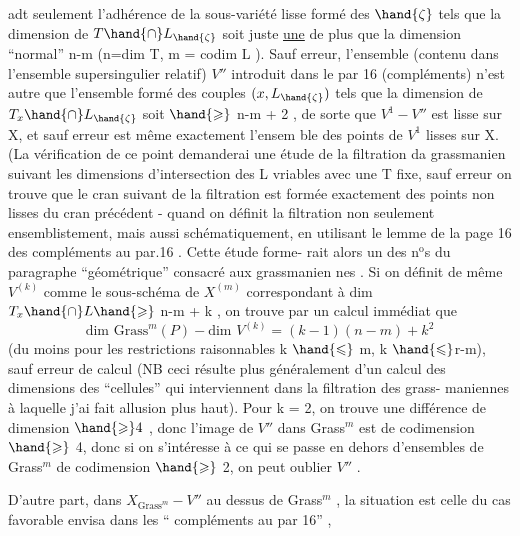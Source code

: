 
adt seulement l'adhérence de la sous-variété lisse formé des $\hand{\zeta}$ tels que
la dimension de $T\hand{\cap}L_{\hand{\zeta}}$ soit juste \uline{une} de plus que la dimension
``normal'' n-m (n=dim T, m = codim L ). Sauf erreur, l'ensemble
(contenu dans l'ensemble supersingulier relatif) $V''$ introduit dans le par
16 (compléments) n'est autre que l'ensemble formé des couples
$(x,L_{\hand{\zeta}})$ tels que la dimension de $T_x\hand{\cap}L_{\hand{\zeta}}$ soit $\hand{\geqslant}$ n-m + 2\hand{)} , de sorte que
 $V^1 - V''$ est  lisse sur X, et sauf erreur est même exactement l'ensem
ble des points de $V^1$ lisses sur X.(La vérification de ce point demanderai
une étude de la filtration da   grassmanien suivant les 
dimensions d'intersection des L vriables avec une T fixe, sauf erreur on
trouve que le cran suivant de la filtration est formée exactement des
points non lisses du cran précédent - quand on définit la filtration
\placedmargin{$|$} non seulement ensemblistement, mais aussi schématiquement, en utilisant
le lemme de la page 16 des compléments au par.16 \hand{\unsure{)|\S}}. Cette étude forme-%
rait alors un des n$^{\text{o}}$s du paragraphe ``géométrique'' consacré aux grassmanien
nes \hand{)}. Si on définit de même  $V^{(k)}$ comme le sous-schéma de $X^{(m)}$
correspondant à dim $T_x\hand{\cap}L \hand{\geqslant}$ n-m + k , on trouve par un calcul immédiat
que 
\[ \text{dim Grass}^m(P) - \text{dim } V^{(k)} = (k-1)(n-m) + k^2 \]
(du moins pour les restrictions raisonnables k $\hand{\leqslant}$ m, k $\hand{\leqslant}$r-m), sauf
erreur de calcul (NB ceci résulte plus généralement d'un calcul des
dimensions des ``cellules'' qui interviennent dans la filtration des grass-%
maniennes à laquelle j'ai fait allusion plus haut). Pour k = 2, on
trouve une différence de dimension $\hand{\geqslant} 4$ , donc l'image de $V''$ dans Grass$^m$
est de codimension $\hand{\geqslant}$ 4, donc si on s'intéresse à ce qui se passe en dehors
d'ensembles de Grass$^m$ de codimension $\hand{\geqslant}$ 2, on peut  oublier $V''$ .

D'autre part, dans $X_{\text{Grass}^m} - V''$ au dessus de Grass$^m$ , la situation
est celle du cas favorable envisa dans les `` compléments au par 16'' ,

